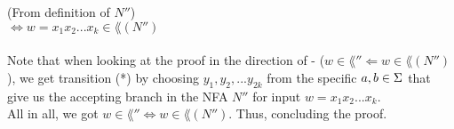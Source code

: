 (From definition of $N''$) \\
$\Longleftrightarrow w=x_1 x_2 . . . x_k \in \lang(N'')$ \\
\\
Note that when looking at the proof in the direction of - ($w \in \lang'' \Longleftarrow  w \in \lang(N'')$),
we get transition (*) by choosing  $y_1,y_2,...y_{2k}$ from the specific $a,b \in \Sigma$ that give us the
accepting branch in the NFA $N''$ for input $w=x_1 x_2 ... x_k$.
\\

All in all, we got $w \in \lang'' \Longleftrightarrow  w \in \lang(N'')$. Thus, concluding the proof. \\

